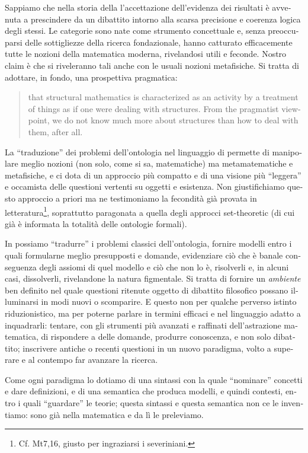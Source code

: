 \begin{italian}
Sappiamo che nella storia della \CT l'accettazione dell'evidenza dei risultati è avvenuta a prescindere da un dibattito intorno alla scarsa precisione e coerenza logica degli stessi. Le categorie sono nate come strumento concettuale e, senza preoccuparsi delle sottigliezze della ricerca fondazionale, hanno catturato efficacemente tutte le nozioni della matematica moderna, rivelandosi utili e feconde. Nostro claim è che si riveleranno tali anche con le usuali nozioni metafisiche. Si tratta di adottare, in fondo, una prospettiva pragmatica:
\begin{quote}
	that structural mathematics is characterized as an activity by a treatment of things as if one were dealing with structures. From the pragmatist viewpoint, we do not know much more about structures than how to deal with them, after all. \hfill \cite{kromer2007tool}
\end{quote}
La ``traduzione'' dei problemi dell'ontologia nel linguaggio di \CT permette di manipolare meglio nozioni (non solo, come si sa, matematiche) ma metamatematiche e metafisiche, e ci dota di un approccio più compatto e di una visione più ``leggera'' e occamista delle questioni vertenti su oggetti e esistenza. Non giustifichiamo questo approccio a priori ma ne testimoniamo la fecondità già provata in letteratura\footnote{Cf. Mt7,16, giusto per ingraziarsi i severiniani.}, soprattutto paragonata a quella degli approcci set-theoretic (di cui già è informata la totalità delle ontologie formali).

In \CT possiamo ``tradurre'' i problemi classici dell'ontologia, fornire modelli entro i quali formularne meglio presupposti e domande, evidenziare ciò che è banale conseguenza degli assiomi di quel modello e ciò che non lo è, risolverli e, in alcuni casi, dissolverli, rivelandone la natura figmentale. Si tratta di fornire un \emph{ambiente} ben definito nel quale questioni ritenute oggetto di dibattito filosofico possano illuminarsi in modi nuovi o scomparire. E questo non per qualche perverso istinto riduzionistico, ma per poterne parlare in termini efficaci e nel linguaggio adatto a inquadrarli: tentare, con gli strumenti più avanzati e raffinati dell'astrazione matematica, di rispondere a delle domande, produrre conoscenza, e non solo dibattito; inscrivere antiche o recenti questioni in un nuovo paradigma, volto a superare e al contempo far avanzare la ricerca.

Come ogni paradigma lo dotiamo di una sintassi con la quale ``nominare'' concetti e dare definizioni, e di una semantica che produca modelli, e quindi contesti, entro i quali ``guardare'' le teorie; questa sintassi e questa semantica non ce le inventiamo: sono già nella matematica e da lì le preleviamo.

\end{italian}
